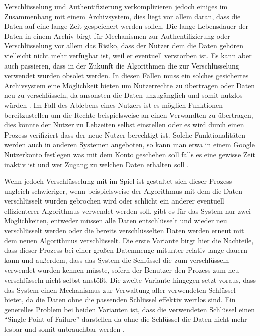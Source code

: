 \documentclass[conference,compsoc,final,a4paper]{IEEEtran}
\begin{document}
Verschlüsselung und Authentifizierung verkomplizieren jedoch einiges im Zusammenhang mit einem Archivsystem, dies liegt vor allem daran, dass die Daten auf eine lange Zeit gespeichert werden sollen. Die lange Lebensdauer der Daten in einem Archiv birgt für Mechanismen zur Authentifizierung oder Verschlüsselung vor allem das Risiko, dass der Nutzer dem die Daten gehören vielleicht nicht mehr verfügbar ist, weil er eventuell verstorben ist. Es kann aber auch passieren, dass in der Zukunft die Algorithmen die zur Verschlüsselung verwendet wurden obsolet werden. In diesen Fällen muss ein solches gesichertes Archivsystem eine Möglichkeit bieten um Nutzerrechte zu übertragen oder Daten neu zu verschlüsseln, da ansonsten die Daten unzugänglich und somit nutzlos würden \autocite{Storer2006}. Im Fall des Ablebens eines Nutzers ist es möglich Funktionen bereitzustellen um die Rechte beispielsweise an einen Verwandten zu übertragen, dies könnte der Nutzer zu Lebzeiten selbst einstellen oder es wird durch einen Prozess verifiziert dass der neue Nutzer berechtigt ist. Solche Funktionalitäten werden auch in anderen Systemen angeboten, so kann man etwa in einem Google Nutzerkonto festlegen was mit dem Konto geschehen soll falls es eine gewisse Zeit inaktiv ist und wer Zugang zu welchen Daten erhalten soll \autocite{GoogleKontoaktivität}.

Wenn jedoch Verschlüsselung mit im Spiel ist gestaltet sich dieser Prozess ungleich schwieriger, wenn beispielsweise der Algorithmus mit dem die Daten verschlüsselt wurden gebrochen wird oder schlicht ein anderer eventuell effizienterer Algorithmus verwendet werden soll, gibt es für das System nur zwei Möglichkeiten, entweder müssen alle Daten entschlüsselt und wieder neu verschlüsselt werden oder die bereits verschlüsselten Daten werden erneut mit dem neuen Algorithmus verschlüsselt. Die erste Variante birgt hier die Nachteile, dass dieser Prozess bei einer großen Datenmenge mitunter relativ lange dauern kann und außerdem, dass das System die Schlüssel die zum verschlüsseln verwendet wurden kennen müsste, sofern der Benutzer den Prozess zum neu verschlüsseln nicht selbst anstößt. Die zweite Variante hingegen setzt voraus, dass das System einen Mechanismus zur Verwaltung aller verwendeten Schlüssel bietet, da die Daten ohne die passenden Schlüssel effektiv wertlos sind. Ein generelles Problem bei beiden Varianten ist, dass die verwendeten Schlüssel einen ``Single Point of Failure'' darstellen da ohne die Schlüssel die Daten nicht mehr lesbar und somit unbrauchbar werden \autocite{Storer2006}.
\end{document}
